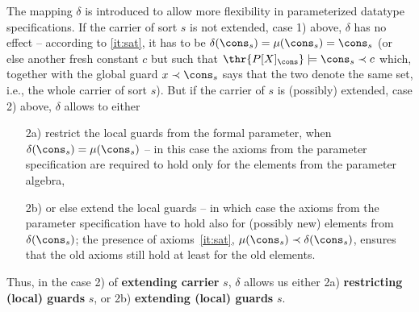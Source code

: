 The mapping $\delta$ is introduced to allow more flexibility in
parameterized datatype specifications. If the carrier of sort $s$ is not
extended, case 1) above, $\delta$ has no effect -- according to
\ref{it:sat}, it has to be $\delta(\cons_s)=\mu(\cons_s)=\cons_s$ (or else
another fresh constant $c$ but such that $\thr{P[X]_\cons}\models
\cons_s\prec c$ which, together with the global guard $x\prec \cons_s$ says
that the two denote the same set, i.e., the whole carrier of sort $s$). But if the carrier of $s$
is (possibly) extended, case 2) above, $\delta$ allows to
either 
\begin{itemize}\MyLPar
\item[2a)] restrict the local guards from the formal parameter, when
$\delta(\cons_s)=\mu(\cons_s)$ -- in this case the axioms from
the parameter specification are required to hold only for the elements from the
parameter algebra, 
\item[2b)] 
or else extend the local guards -- in which case the axioms from the parameter
specification have to hold also for (possibly new) elements from
$\delta(\cons_s)$; the presence of axioms~\ref{it:sat}, $\mu(\cons_s) \prec
\delta(\cons_s)$, ensures that the old axioms still hold at least for the old elements.
\end{itemize}
Thus, in the case 2) of {\bf extending carrier} $s$, 
$\delta$ allows us either 2a) {\bf restricting (local) guards} $s$,
or 2b) {\bf extending (local) guards} $s$.

